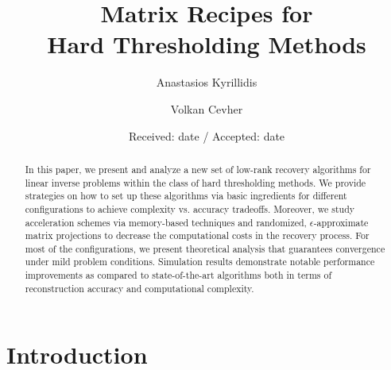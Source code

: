 \documentclass[twocolumn]{svjour3}
\author{\IEEEauthorblockN{Anastasios Kyrillidis \and Volkan Cevher \\}}
\begin{document}
\title{Matrix Recipes for \\ Hard Thresholding Methods}

\author{Anastasios Kyrillidis \and Volkan Cevher}


\date{Received: date / Accepted: date}

\maketitle

\begin{abstract}
In this paper, we present and analyze a new set of low-rank recovery algorithms for linear inverse problems within the class of hard thresholding methods. We provide strategies on how to set up these algorithms via basic ingredients for different configurations to achieve complexity vs. accuracy tradeoffs. Moreover, we study acceleration schemes via memory-based techniques and randomized, $\epsilon$-approximate matrix projections to decrease the computational costs in the recovery process. For most of the configurations, we present theoretical analysis that guarantees convergence under mild problem conditions.  Simulation results demonstrate notable performance improvements as compared to state-of-the-art algorithms both in terms of reconstruction accuracy and computational complexity.

\end{abstract}

\section{Introduction}
\end{document}
